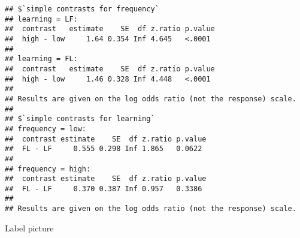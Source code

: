 \documentclass[
]{article}
\newenvironment{Shaded}{\begin{snugshade}}{\end{snugshade}}
\newcommand{\DataTypeTok}[1]{\textcolor[rgb]{0.13,0.29,0.53}{#1}}
\newcommand{\KeywordTok}[1]{\textcolor[rgb]{0.13,0.29,0.53}{\textbf{#1}}}
\newcommand{\NormalTok}[1]{#1}
\newcommand{\OperatorTok}[1]{\textcolor[rgb]{0.81,0.36,0.00}{\textbf{#1}}}
\newcommand{\StringTok}[1]{\textcolor[rgb]{0.31,0.60,0.02}{#1}}
\begin{document}
\begin{verbatim}
## $`simple contrasts for frequency`
## learning = LF:
##  contrast   estimate    SE  df z.ratio p.value
##  high - low     1.64 0.354 Inf 4.645   <.0001 
## 
## learning = FL:
##  contrast   estimate    SE  df z.ratio p.value
##  high - low     1.46 0.328 Inf 4.448   <.0001 
## 
## Results are given on the log odds ratio (not the response) scale. 
## 
## $`simple contrasts for learning`
## frequency = low:
##  contrast estimate    SE  df z.ratio p.value
##  FL - LF     0.555 0.298 Inf 1.865   0.0622 
## 
## frequency = high:
##  contrast estimate    SE  df z.ratio p.value
##  FL - LF     0.370 0.387 Inf 0.957   0.3386 
## 
## Results are given on the log odds ratio (not the response) scale.
\end{verbatim}

Label picture

\begin{Shaded}
\end{Shaded}
\end{document}

